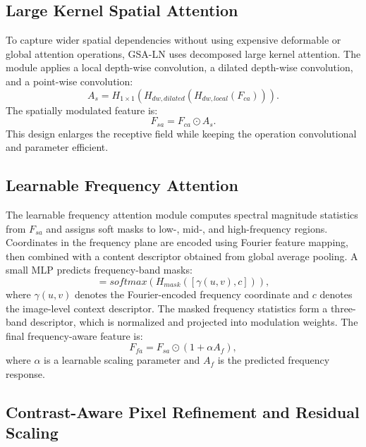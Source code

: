 \documentclass[conference]{IEEEtran}
\begin{document}
\subsection{Large Kernel Spatial Attention}

To capture wider spatial dependencies without using expensive deformable or global attention operations, GSA-LN uses decomposed large kernel attention. The module applies a local depth-wise convolution, a dilated depth-wise convolution, and a point-wise convolution:
\begin{equation}
A_s = H_{1 \times 1}(H_{dw,dilated}(H_{dw,local}(F_{ca}))).
\end{equation}
The spatially modulated feature is:
\begin{equation}
F_{sa} = F_{ca} \odot A_s.
\end{equation}
This design enlarges the receptive field while keeping the operation convolutional and parameter efficient.

\subsection{Learnable Frequency Attention}

The learnable frequency attention module computes spectral magnitude statistics from $F_{sa}$ and assigns soft masks to low-, mid-, and high-frequency regions. Coordinates in the frequency plane are encoded using Fourier feature mapping, then combined with a content descriptor obtained from global average pooling. A small MLP predicts frequency-band masks:
\begin{equation}
[B_l, B_m, B_h] = softmax(H_{mask}([\gamma(u,v), c])),
\end{equation}
where $\gamma(u,v)$ denotes the Fourier-encoded frequency coordinate and $c$ denotes the image-level context descriptor. The masked frequency statistics form a three-band descriptor, which is normalized and projected into modulation weights. The final frequency-aware feature is:
\begin{equation}
F_{fa} = F_{sa} \odot (1 + \alpha A_f),
\end{equation}
where $\alpha$ is a learnable scaling parameter and $A_f$ is the predicted frequency response.

\subsection{Contrast-Aware Pixel Refinement and Residual Scaling}
\end{document}
